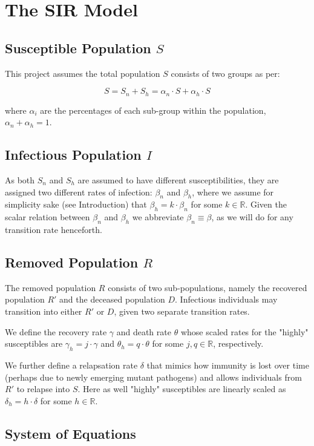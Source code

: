 \section{The SIR Model}

\subsection{Susceptible Population $S$}
This project assumes the total population $S$ consists of two groups as per:
	

$$
S = S_n + S_h = \alpha_n  \cdot S + \alpha_h \cdot S
$$

where $\alpha_i$ are the percentages of each sub-group within the population, $\alpha_n + \alpha_h = 1$. 

\subsection{Infectious Population $I$}
As both $S_n$ and $S_h$ are assumed to have different susceptibilities, they are assigned two different rates of infection: $\beta_n$ and $\beta_h$, where we assume for simplicity sake (see Introduction) that $\beta_h = k\cdot\beta_n$ for some $k \in \mathbb{R}$. Given the scalar relation between $\beta_n$ and $\beta_h$ we abbreviate $\beta_n \equiv \beta$, as we will do for any transition rate henceforth.


\subsection{Removed Population $R$}
The removed population $R$ consists of two sub-populations, namely the recovered population $R'$ and the deceased population $D$. Infectious individuals may transition into either $R'$ or $D$, given two separate transition rates. 

We define the recovery rate $\gamma$ and death rate $\theta$ whose scaled rates for the "highly" susceptibles are $\gamma_h = j\cdot\gamma$ and $\theta_h = q \cdot \theta$ for some $j, q \in \mathbb{R}$, respectively.

We further define a relapsation rate $\delta$ that mimics how immunity is lost over time (perhaps due to newly emerging mutant pathogens) and allows individuals from $R'$ to relapse into $S$. Here as well "highly" susceptibles are linearly scaled as $\delta_h = h \cdot \delta$ for some $h \in \mathbb{R}$. 

\subsection{System of Equations}

